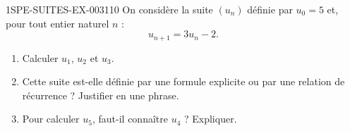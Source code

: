 \begin{exercice}{1SPE-SUITES-EX-003}{1}{10}
On considère la suite $(u_n)$ définie par $u_0 = 5$ et, pour tout entier naturel $n$ :
\[
  u_{n+1} = 3u_n - 2.
\]
\begin{enumerate}
  \item Calculer $u_1$, $u_2$ et $u_3$.
  \item Cette suite est-elle définie par une formule explicite ou par une relation de récurrence ? Justifier en une phrase.
  \item Pour calculer $u_5$, faut-il connaître $u_4$ ? Expliquer.
\end{enumerate}
\end{exercice}
